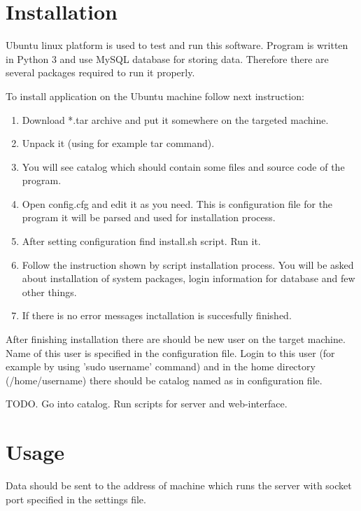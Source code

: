 \documentclass[12pt]{article}
\begin{document}
\section{Installation}
\par Ubuntu linux platform is used to test and run this software. Program is
written in Python 3 and use MySQL database for storing data. Therefore there
are several packages required to run it properly.
\par To install application on the Ubuntu machine follow next instruction:
\begin{enumerate}
    \item Download *.tar archive and put it somewhere on the targeted machine.
    \item Unpack it (using for example tar command).
    \item You will see catalog which should contain some files and source code
    of the program. 
    \item Open config.cfg and edit it as you need. This is configuration file
    for the program it will be parsed and used for installation process.
    \item After setting configuration find install.sh script. Run it.
    \item Follow the instruction shown by script installation process. You will
    be asked about installation of system packages, login information 
    for database and few other things.
    \item If there is no error messages inctallation is succesfully finished.
\end{enumerate}

\par After finishing installation there are should be new user on the target
machine. Name of this user is specified in the configuration file. Login to
this user (for example by using 'sudo username' command) and in the home
directory (/home/username) there should be catalog named as in configuration
file. 
\par TODO. Go into catalog. Run scripts for server and web-interface.

\section{Usage}
\par Data should be sent to the address of machine which runs the server with
socket port specified in the settings file.
\end{document}
